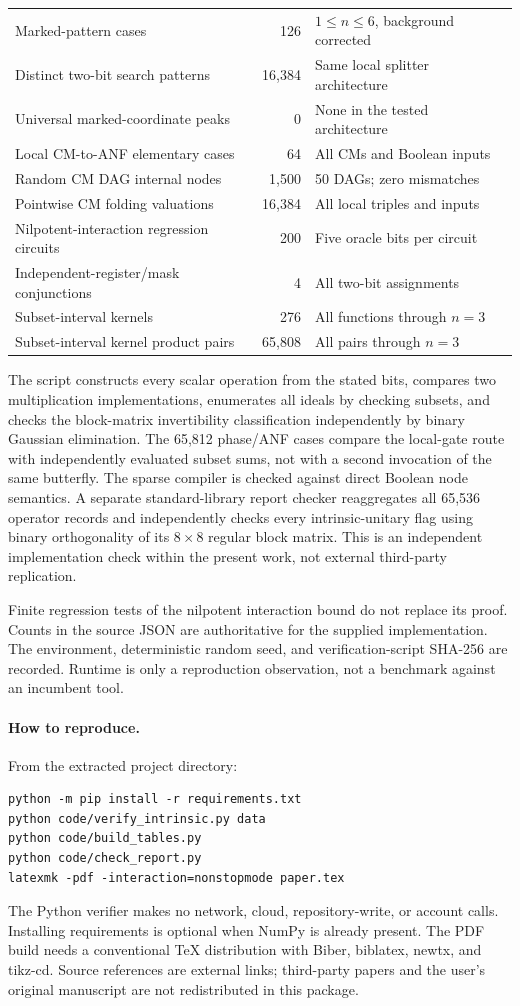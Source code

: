 \begin{longtable}{@{}L{0.48\textwidth}rL{0.31\textwidth}@{}}
Marked-pattern cases & 126 & $1\le n\le6$, background corrected\\
Distinct two-bit search patterns & 16,384 & Same local splitter architecture\\
Universal marked-coordinate peaks & 0 & None in the tested architecture\\
Local CM-to-ANF elementary cases & 64 & All CMs and Boolean inputs\\
Random CM DAG internal nodes & 1,500 & 50 DAGs; zero mismatches\\
Pointwise CM folding valuations & 16,384 & All local triples and inputs\\
Nilpotent-interaction regression circuits & 200 & Five oracle bits per circuit\\
Independent-register/mask conjunctions & 4 & All two-bit assignments\\
Subset-interval kernels & 276 & All functions through $n=3$\\
Subset-interval kernel product pairs & 65,808 & All pairs through $n=3$\\
\bottomrule\end{longtable}
The script constructs every scalar operation from the stated bits, compares two multiplication implementations, enumerates all ideals by checking subsets, and checks the block-matrix invertibility classification independently by binary Gaussian elimination. The 65,812 phase/ANF cases compare the local-gate route with independently evaluated subset sums, not with a second invocation of the same butterfly. The sparse compiler is checked against direct Boolean node semantics. A separate standard-library report checker reaggregates all 65,536 operator records and independently checks every intrinsic-unitary flag using binary orthogonality of its $8\times8$ regular block matrix. This is an independent implementation check within the present work, not external third-party replication.

Finite regression tests of the nilpotent interaction bound do not replace its proof. Counts in the source JSON are authoritative for the supplied implementation. The environment, deterministic random seed, and verification-script SHA-256 are recorded. Runtime is only a reproduction observation, not a benchmark against an incumbent tool.

\paragraph{How to reproduce.}
From the extracted project directory:
\begin{verbatim}
python -m pip install -r requirements.txt
python code/verify_intrinsic.py data
python code/build_tables.py
python code/check_report.py
latexmk -pdf -interaction=nonstopmode paper.tex
\end{verbatim}
The Python verifier makes no network, cloud, repository-write, or account calls. Installing requirements is optional when NumPy is already present. The PDF build needs a conventional TeX distribution with Biber, biblatex, newtx, and tikz-cd. Source references are external links; third-party papers and the user's original manuscript are not redistributed in this package.

